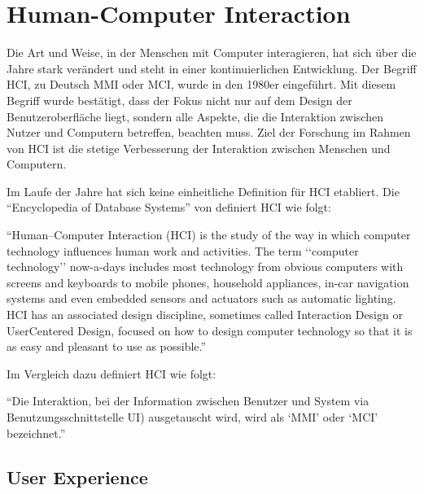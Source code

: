 \section{Human-Computer Interaction}\label{sec:ux}

Die Art und Weise, in der Menschen mit Computer interagieren, hat sich über die Jahre stark verändert und steht in einer kontinuierlichen Entwicklung. 
Der Begriff  \ac{HCI}, zu Deutsch \ac{MMI} oder \ac{MCI}, wurde in den 1980er eingeführt.
Mit diesem Begriff wurde bestätigt, dass der Fokus nicht nur auf dem Design der Benutzeroberfläche liegt, sondern alle Aspekte, die die Interaktion zwischen Nutzer und Computern betreffen, beachten muss. \citep[vgl.]{preece_human-computer_1995}
Ziel der Forschung im Rahmen von \ac{HCI} ist die stetige Verbesserung der Interaktion zwischen Menschen und Computern. \newline

\noindent Im Laufe der Jahre hat sich keine einheitliche Definition für \ac{HCI} etabliert.
Die \enquote{Encyclopedia of Database Systems} von \citet{dix_human-computer_2009} definiert \ac{HCI} wie folgt:
\begin{definition}
  \enquote{Human–Computer Interaction (HCI) is the study of the way in which computer technology influences human work and activities. 
  The term ‘‘computer technology’’ now-a-days includes most technology from obvious computers with screens and keyboards to mobile phones, household appliances, in-car navigation
  systems and even embedded sensors and actuators such as automatic lighting. 
  HCI has an associated design discipline, sometimes called Interaction Design or UserCentered Design, focused on how to design computer technology so that it is as easy and
  pleasant to use as possible.}
\end{definition}

\noindent Im Vergleich dazu definiert \citet{heimgartner_interkulturelles_2017}  \ac{HCI}  wie folgt:

\begin{definition}
  \enquote{Die Interaktion, bei der Information zwischen Benutzer und System via Benutzungsschnittstelle \ac{UI}) ausgetauscht wird, wird als \enquote{\ac{MMI}}  oder  \enquote{\ac{MCI}} bezeichnet.}
\end{definition}

\subsection{User Experience}

